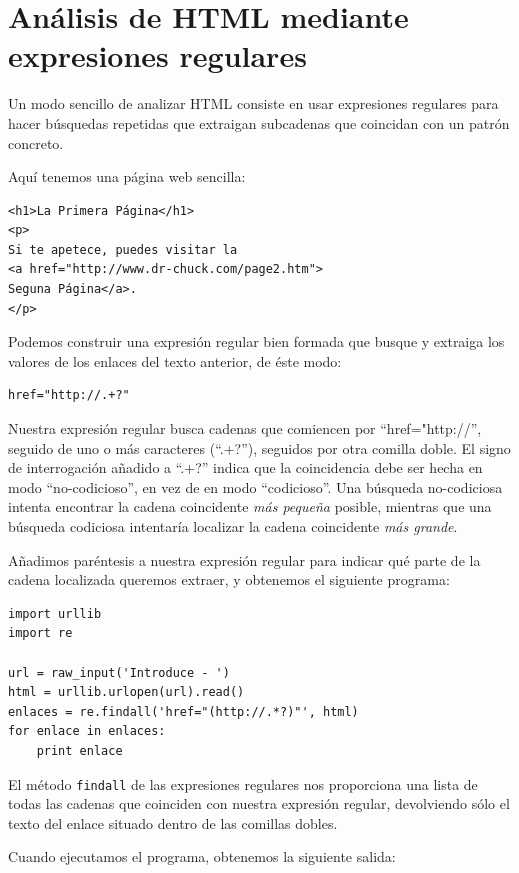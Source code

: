 \section{Análisis de HTML mediante expresiones regulares}

Un modo sencillo de analizar HTML consiste en usar expresiones regulares para
hacer búsquedas repetidas que extraigan subcadenas que coincidan con un patrón concreto.

Aquí tenemos una página web sencilla:

\beforeverb
\begin{verbatim}
<h1>La Primera Página</h1>
<p>
Si te apetece, puedes visitar la
<a href="http://www.dr-chuck.com/page2.htm">
Seguna Página</a>.
</p>
\end{verbatim}
\afterverb
%
Podemos construir una expresión regular bien formada que busque
y extraiga los valores de los enlaces del texto anterior, de éste modo:

\beforeverb
\begin{verbatim}
href="http://.+?"
\end{verbatim}
\afterverb
%
Nuestra expresión regular busca cadenas que comiencen por
``href="http://'', seguido de uno o más caracteres
(``.+?''), seguidos por otra comilla doble. El signo de interrogación
añadido a ``.+?'' indica que la coincidencia debe ser hecha
en modo ``no-codicioso'', en vez de en modo ``codicioso''.
Una búsqueda no-codiciosa intenta encontrar la cadena coincidente
{\em más pequeña} posible, mientras que una búsqueda codiciosa intentaría
localizar la cadena coincidente {\em más grande}.

Añadimos paréntesis a nuestra expresión regular para indicar
qué parte de la cadena localizada queremos extraer, y
obtenemos el siguiente programa:

\beforeverb
\begin{verbatim}
import urllib
import re

url = raw_input('Introduce - ')
html = urllib.urlopen(url).read()
enlaces = re.findall('href="(http://.*?)"', html)
for enlace in enlaces:
    print enlace
\end{verbatim}
\afterverb
%
El método {\tt findall} de las expresiones regulares nos proporciona una lista de todas
las cadenas que coinciden con nuestra expresión regular, devolviendo sólo
el texto del enlace situado dentro de las comillas dobles.

Cuando ejecutamos el programa, obtenemos la siguiente salida:

